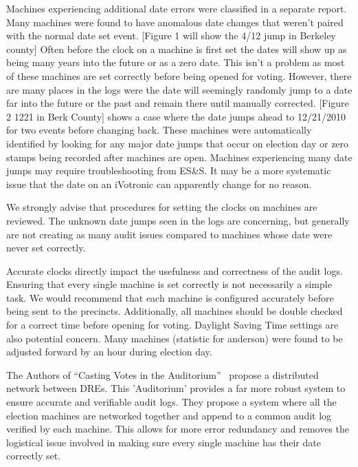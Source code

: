 Machines experiencing additional date errors were classified in a separate report.  Many machines were found to have anomalous date changes that weren't paired with the normal date set event. [Figure 1 will show the 4/12 jump in Berkeley county] Often before the clock on a machine is first set the dates will show up as being many years into the future or as a zero date.  This isn't a problem as most  of these machines are set correctly before being opened for voting.  However, there are many places in the logs were the date will seemingly randomly jump to a date far into the future or the past and remain there until manually corrected.  [Figure 2 12\/21 in Berk County] shows a case where the date jumps ahead to 12/21/2010 for two events before changing back.  These machines were automatically identified by looking for any major date jumps that occur on election day or zero stamps being recorded after machines are open. Machines experiencing many date jumps may require troubleshooting from ES\&S.  It may be a more systematic issue that the date on an iVotronic can apparently change for no reason.

We strongly advise that procedures for setting the clocks on machines are reviewed.  The unknown date jumps seen in the logs are concerning, but generally are not creating as many audit issues compared to machines whose date were never set correctly.

Accurate clocks directly impact the usefulness and correctness of the audit logs. Ensuring that every single machine is set correctly is not necessarily a simple task.  We would recommend that each machine is configured accurately before being sent to the precincts.  Additionally, all machines should be double checked for a correct time before opening for voting.  Daylight Saving Time settings are also potential concern.  Many machines (statistic for anderson) were found to be adjusted forward by an hour during election day.  

The Authors of “Casting Votes in the Auditorium”~\cite{Sandler2007} propose a distributed network between DREs.  This 'Auditorium' provides a far more robust system to ensure accurate and verifiable audit logs.  They propose a system where all the election machines are networked together and append to a common audit log verified by each machine.  This allows for more error redundancy and removes the logistical issue involved in making sure every single machine has their date correctly set.
